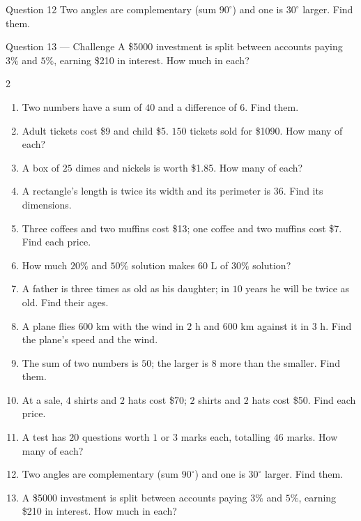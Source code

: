 \documentclass[11pt]{article}
\begin{document}
\begin{qbox}{Question 12}
Two angles are complementary (sum $90^\circ$) and one is $30^\circ$ larger. Find them.\workspace{2.4cm}
\end{qbox}

\begin{qbox}{Question 13 --- Challenge}
A \$5000 investment is split between accounts paying $3\%$ and $5\%$, earning \$210 in interest. How much in each?\workspace{3.2cm}
\end{qbox}

\clearpage
{}

\begin{recapbox}
\begin{multicols}{2}
\small
\begin{enumerate}[leftmargin=*,itemsep=3pt]
  \item Two numbers have a sum of $40$ and a difference of $6$. Find them.
  \item Adult tickets cost \$9 and child \$5. $150$ tickets sold for \$1090. How many of each?
  \item A box of $25$ dimes and nickels is worth \$1.85. How many of each?
  \item A rectangle's length is twice its width and its perimeter is $36$. Find its dimensions.
  \item Three coffees and two muffins cost \$13; one coffee and two muffins cost \$7. Find each price.
  \item How much $20\%$ and $50\%$ solution makes $60$ L of $30\%$ solution?
  \item A father is three times as old as his daughter; in $10$ years he will be twice as old. Find their ages.
  \item A plane flies $600$ km with the wind in $2$ h and $600$ km against it in $3$ h. Find the plane's speed and the wind.
  \item The sum of two numbers is $50$; the larger is $8$ more than the smaller. Find them.
  \item At a sale, $4$ shirts and $2$ hats cost \$70; $2$ shirts and $2$ hats cost \$50. Find each price.
  \item A test has $20$ questions worth $1$ or $3$ marks each, totalling $46$ marks. How many of each?
  \item Two angles are complementary (sum $90^\circ$) and one is $30^\circ$ larger. Find them.
  \item A \$5000 investment is split between accounts paying $3\%$ and $5\%$, earning \$210 in interest. How much in each?
\end{enumerate}
\end{multicols}
\end{recapbox}
\end{document}
